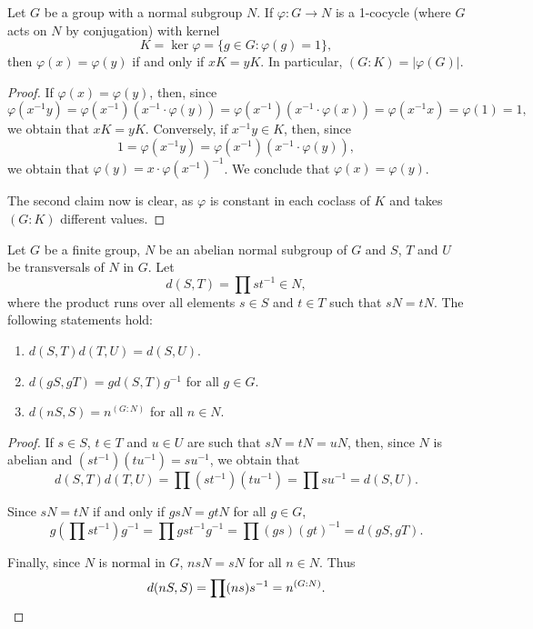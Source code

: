 \begin{lemma}
\label{lem:1cocycle}
Let $G$ be a group with a normal subgroup $N$. 
If $\varphi\colon G\to N$ is a 1-cocycle (where $G$ acts on $N$ by conjugation)
with kernel 
\[
K=\ker\varphi=\{g\in G:\varphi(g)=1\}, 
\]
then 
$\varphi(x)=\varphi(y)$ if and only if $xK=yK$. In particular,
$(G:K)=|\varphi(G)|$. 
\end{lemma}

\begin{proof}
If $\varphi(x)=\varphi(y)$, then, since  
\[
\varphi(x^{-1}y)
=\varphi(x^{-1})(x^{-1}\cdot\varphi(y))
=\varphi(x^{-1})(x^{-1}\cdot\varphi(x))
=\varphi(x^{-1}x)=\varphi(1)
=1,
\]
we obtain that $xK=yK$. Conversely, if $x^{-1}y\in K$, then, since 
\[
1=\varphi(x^{-1}y)=\varphi(x^{-1})(x^{-1}\cdot \varphi(y)),
\]
we obtain that $\varphi(y)=x\cdot\varphi(x^{-1})^{-1}$. We conclude that 
$\varphi(x)=\varphi(y)$.

The second claim now is clear, as $\varphi$ is constant in each coclass of $K$ 
and takes $(G:K)$ different values. 
\end{proof}

\begin{lemma}
	\label{lem:d}
	Let $G$ be a finite group, $N$ be an abelian normal subgroup of $G$ and $S$, $T$ and $U$
    be transversals of $N$ in $G$. Let 
	\[
	d(S,T)=\prod st^{-1}\in N,
	\]
	where the product runs over all elements $s\in S$ and $t\in T$ such that 
	$sN=tN$. The following statements hold: 
	\begin{enumerate}
		\item $d(S,T)d(T,U)=d(S,U)$.
		\item $d(gS,gT)=gd(S,T)g^{-1}$ for all $g\in G$.
		\item $d(nS,S)=n^{(G:N)}$ for all $n\in N$.
	\end{enumerate}
\end{lemma}

\begin{proof}
	If $s\in S$, $t\in T$ and $u\in U$ are such that $sN=tN=uN$, then, since $N$ is 
	abelian and $(st^{-1})(tu^{-1})=su^{-1}$, we obtain that 
	\[
		d(S,T)d(T,U)=\prod (st^{-1})(tu^{-1})=\prod su^{-1}=d(S,U).
	\]

	Since $sN=tN$ if and only if $gsN=gtN$ for all $g\in G$, 
	\[
	g\left(\prod st^{-1}\right)g^{-1}=\prod gst^{-1}g^{-1}=\prod (gs)(gt)^{-1}=d(gS,gT).
	\]

	Finally, since $N$ is normal in $G$, $nsN=sN$ for all $n\in N$. Thus 
	\[
		d(nS,S)=\prod (ns)s^{-1}=n^{(G:N)}.\qedhere
	\]
\end{proof}

